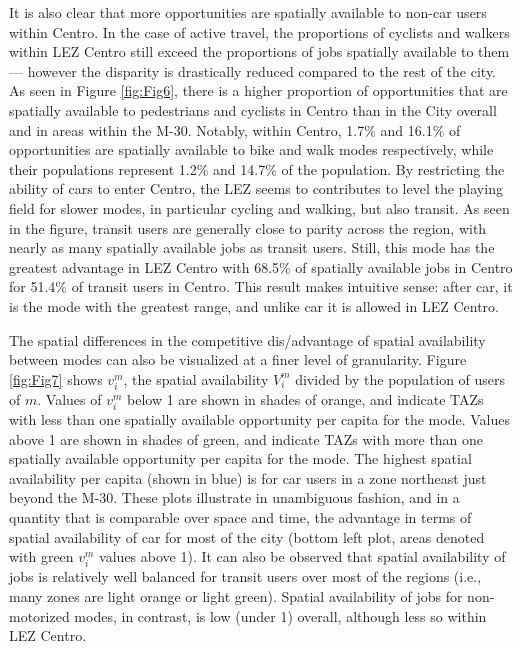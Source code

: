 \documentclass[10pt,letterpaper]{article}
\begin{document}
It is also clear that more opportunities are spatially available to
non-car users within Centro. In the case of active travel, the
proportions of cyclists and walkers within LEZ Centro still exceed the
proportions of jobs spatially available to them --- however the
disparity is drastically reduced compared to the rest of the city. As
seen in Figure \ref{fig:Fig6}, there is a higher proportion of
opportunities that are spatially available to pedestrians and cyclists
in Centro than in the City overall and in areas within the M-30.
Notably, within Centro, 1.7\% and 16.1\% of opportunities are spatially
available to bike and walk modes respectively, while their populations
represent 1.2\% and 14.7\% of the population. By restricting the ability
of cars to enter Centro, the LEZ seems to contributes to level the
playing field for slower modes, in particular cycling and walking, but
also transit. As seen in the figure, transit users are generally close
to parity across the region, with nearly as many spatially available
jobs as transit users. Still, this mode has the greatest advantage in
LEZ Centro with 68.5\% of spatially available jobs in Centro for 51.4\%
of transit users in Centro. This result makes intuitive sense: after
car, it is the mode with the greatest range, and unlike car it is
allowed in LEZ Centro.

The spatial differences in the competitive dis/advantage of spatial
availability between modes can also be visualized at a finer level of
granularity. Figure \ref{fig:Fig7} shows \(v_i^m\), the spatial
availability \(V_i^m\) divided by the population of users of \(m\).
Values of \(v_i^m\) below 1 are shown in shades of orange, and indicate
TAZs with less than one spatially available opportunity per capita for
the mode. Values above 1 are shown in shades of green, and indicate TAZs
with more than one spatially available opportunity per capita for the
mode. The highest spatial availability per capita (shown in blue) is for
car users in a zone northeast just beyond the M-30. These plots
illustrate in unambiguous fashion, and in a quantity that is comparable
over space and time, the advantage in terms of spatial availability of
car for most of the city (bottom left plot, areas denoted with green
\(v_i^m\) values above 1). It can also be observed that spatial
availability of jobs is relatively well balanced for transit users over
most of the regions (i.e., many zones are light orange or light green).
Spatial availability of jobs for non-motorized modes, in contrast, is
low (under 1) overall, although less so within LEZ Centro.
\end{document}
